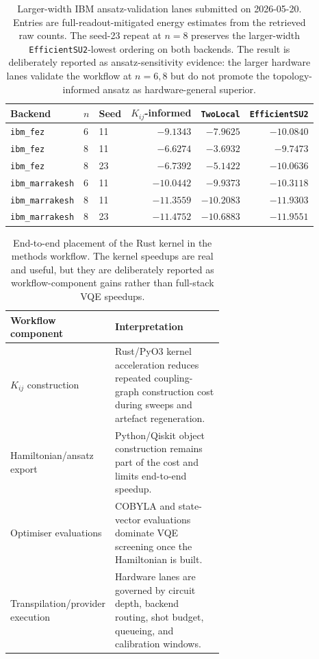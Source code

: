 \documentclass[preprint,aps,physrev,superscriptaddress,floatfix,longbibliography]{revtex4-2}
\begin{document}
\begin{table}[tb]
\centering
\small
\begin{tabular}{lllrrr}
\toprule
Backend & $n$ & Seed & $K_{ij}$-informed & \texttt{TwoLocal} & \texttt{EfficientSU2} \\
\midrule
\texttt{ibm\_fez} & 6 & 11 & $-9.1343$ & $-7.9625$ & $-10.0840$ \\
\texttt{ibm\_fez} & 8 & 11 & $-6.6274$ & $-3.6932$ & $-9.7473$ \\
\texttt{ibm\_fez} & 8 & 23 & $-6.7392$ & $-5.1422$ & $-10.0636$ \\
\texttt{ibm\_marrakesh} & 6 & 11 & $-10.0442$ & $-9.9373$ & $-10.3118$ \\
\texttt{ibm\_marrakesh} & 8 & 11 & $-11.3559$ & $-10.2083$ & $-11.9303$ \\
\texttt{ibm\_marrakesh} & 8 & 23 & $-11.4752$ & $-10.6883$ & $-11.9551$ \\
\bottomrule
\end{tabular}
\caption{Larger-width IBM ansatz-validation lanes submitted on 2026-05-20.
Entries are full-readout-mitigated energy estimates from the retrieved raw
counts. The seed-23 repeat at $n=8$ preserves the larger-width
\texttt{EfficientSU2}-lowest ordering on both backends. The result is
deliberately reported as ansatz-sensitivity evidence: the larger hardware
lanes validate the workflow at $n=6,8$ but do not promote the
topology-informed ansatz as hardware-general superior.}
\label{tab:hardwareansatzlarge}
\end{table}

\begin{table}[tb]
\centering
\small
\begin{tabular}{lp{0.62\linewidth}}
\toprule
Workflow component & Interpretation \\
\midrule
$K_{ij}$ construction & Rust/PyO3 kernel acceleration reduces repeated
coupling-graph construction cost during sweeps and artefact regeneration. \\
Hamiltonian/ansatz export & Python/Qiskit object construction remains part of
the cost and limits end-to-end speedup. \\
Optimiser evaluations & COBYLA and state-vector evaluations dominate VQE
screening once the Hamiltonian is built. \\
Transpilation/provider execution & Hardware lanes are governed by circuit
depth, backend routing, shot budget, queueing, and calibration windows. \\
\bottomrule
\end{tabular}
\caption{End-to-end placement of the Rust kernel in the methods workflow. The
kernel speedups are real and useful, but they are deliberately reported as
workflow-component gains rather than full-stack VQE speedups.}
\label{tab:endtoendbreakdown}
\end{table}
\end{document}
